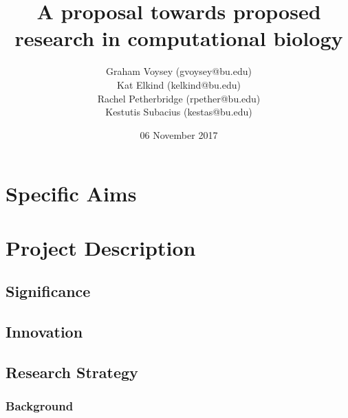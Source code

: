 \documentclass[11pt]{article}
\begin{document}
\title{A proposal towards proposed research in computational biology}
\date{06 November 2017}
\author{Graham Voysey (gvoysey@bu.edu)\\
	    Kat Elkind (kelkind@bu.edu)\\
	    Rachel Petherbridge (rpether@bu.edu)\\
	    Kestutis Subacius (kestas@bu.edu)}
\maketitle
\section{Specific Aims}
\section{Project Description}

	\subsection{Significance}
	\subsection{Innovation}
	\subsection{Research Strategy}
		\subsubsection{Background}
\end{document}

